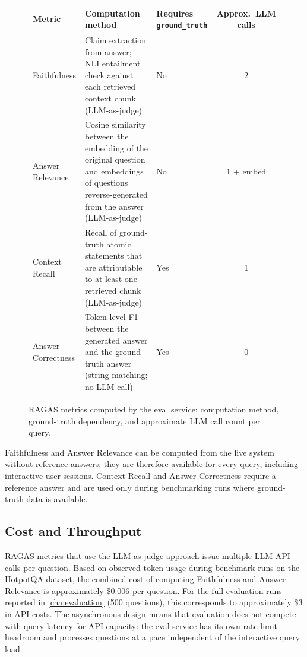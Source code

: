 \begin{figure}[htbp]
  \centering
  \begin{tabularx}{\textwidth}{lXlc}
    \toprule
    \textbf{Metric} & \textbf{Computation method} &
    \textbf{Requires \texttt{ground\_truth}} & \textbf{Approx.\ LLM calls} \\
    \midrule
    Faithfulness &
      Claim extraction from answer; NLI entailment check against each
      retrieved context chunk (LLM-as-judge) &
      No & 2 \\
    Answer Relevance &
      Cosine similarity between the embedding of the original question and
      embeddings of questions reverse-generated from the answer (LLM-as-judge) &
      No & 1 + embed \\
    Context Recall &
      Recall of ground-truth atomic statements that are attributable to at
      least one retrieved chunk (LLM-as-judge) &
      Yes & 1 \\
    Answer Correctness &
      Token-level F1 between the generated answer and the ground-truth
      answer (string matching; no LLM call) &
      Yes & 0 \\
    \bottomrule
  \end{tabularx}
  \caption[Evaluation pipeline and RAGAS metrics.]{RAGAS metrics computed by the eval service: computation method, ground-truth dependency, and approximate LLM call count per query.}
  \label{fig:ragas_pipeline}
\end{figure}

Faithfulness and Answer Relevance can be computed from the live system without
reference answers; they are therefore available for every query, including
interactive user sessions.  Context Recall and Answer Correctness require a
reference answer and are used only during benchmarking runs where ground-truth
data is available.

\subsection{Cost and Throughput}

RAGAS metrics that use the LLM-as-judge approach issue multiple LLM API calls
per question.  Based on observed token usage during benchmark runs on the
HotpotQA dataset, the combined cost of computing Faithfulness and Answer
Relevance is approximately \$0.006 per question.  For the full evaluation runs
reported in \cref{cha:evaluation} (500 questions), this corresponds to
approximately \$3 in API costs.  The asynchronous design means that evaluation
does not compete with query latency for API capacity: the eval service has its
own rate-limit headroom and processes questions at a pace independent of the
interactive query load.

